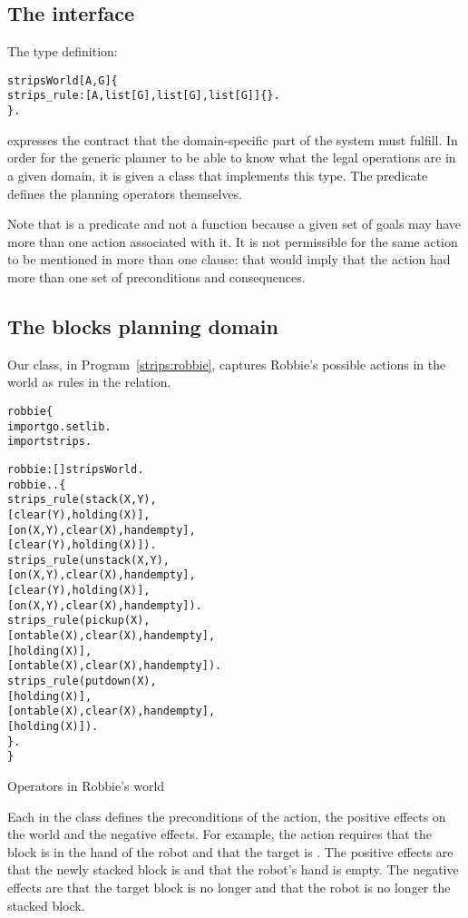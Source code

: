 \subsection{The  interface}
\label{strips:world}
The  type definition:
\begin{alltt}
stripsWorld[A,G] \impl \{
  strips_rule:[A,list[G],list[G],list[G]]\{\}.
\}.
\end{alltt}
expresses the contract that the domain-specific part of the system must fulfill. In order for the generic planner to be able to know what the legal operations are in a given domain, it is given a class that implements this type. The  predicate defines the planning operators themselves.

Note that  is a predicate and not a function because a given set of goals may have more than one action associated with it. It is not permissible for the same action to be mentioned in more than one  clause: that would imply that the action had more than one set of preconditions and consequences.

\subsection{The blocks planning domain}
Our  class, in Program~\vref{strips:robbie}, captures Robbie's possible actions in the world as rules in the  relation.
\begin{program}
\vspace{0.5ex}
\begin{alltt}
robbie\{
  import go.setlib.
  import strips.

  robbie:[]\conarrow{}stripsWorld.
  robbie..\{
    strips\_rule(stack(X,Y),
              [clear(Y),holding(X)],
              [on(X,Y),clear(X),handempty],
              [clear(Y),holding(X)]).
    strips\_rule(unstack(X,Y),
              [on(X,Y),clear(X),handempty],
              [clear(Y),holding(X)],
              [on(X,Y),clear(X),handempty]).
    strips\_rule(pickup(X),
              [ontable(X),clear(X),handempty],
              [holding(X)],
              [ontable(X),clear(X),handempty]).
    strips\_rule(putdown(X),
              [holding(X)],
              [ontable(X),clear(X),handempty],
              [holding(X)]).
  \}.
\}
\end{alltt}
\vspace{-2ex}
\caption{Operators in Robbie's world}
\label{strips:robbie}
\end{program}
Each  in the  class defines the preconditions of the action, the positive effects on the world and the negative effects. For example, the  action requires that the block is in the hand of the robot and that the target is . The positive effects are that the newly stacked block is  and that the robot's hand is empty. The negative effects are that the target block is no longer  and that the robot is no longer  the stacked block.


